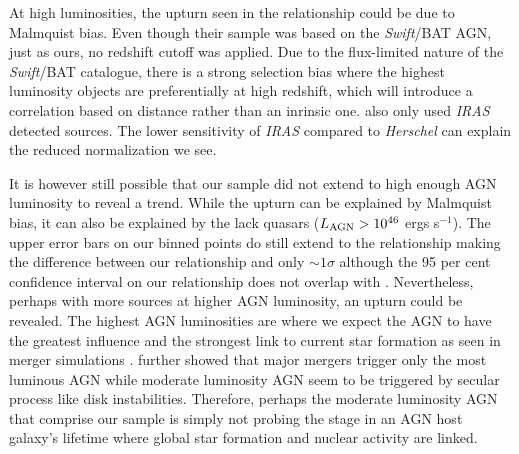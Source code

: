 \documentclass[fleqn, usenatbib]{mnras}
\newcommand{\herschel}{\emph{Herschel}}
\newcommand{\swift}{\textit{Swift}}
\begin{document}
At high luminosities, the upturn seen in the \citet{Rosario:2012fr} relationship could be due to Malmquist bias. Even though their sample was based on the \swift/BAT AGN, just as ours, no redshift cutoff was applied. Due to the flux-limited nature of the \swift/BAT catalogue, there is a strong selection bias where the highest luminosity objects are preferentially at high redshift, which will introduce a correlation based on distance rather than an inrinsic one. \citet{Rosario:2012fr} also only used \textit{IRAS} detected sources. The lower sensitivity of \textit{IRAS} compared to \herschel{} can explain the reduced normalization we see. %

It is however still possible that our sample did not extend to high enough AGN luminosity to reveal a trend. While the upturn can be explained by Malmquist bias, it can also be explained by the lack quasars ($L_{\rm AGN} > 10^{46}$ ergs s$^{-1}$). The upper error bars on our binned points do still extend to the \citet{Rosario:2012fr} relationship making the difference between our relationship and \citet{Rosario:2012fr} only $\sim1\sigma$ although the 95 per cent confidence interval on our relationship does not overlap with \citet{Rosario:2012fr}. Nevertheless, perhaps with more sources at higher AGN luminosity, an upturn could be revealed. The highest AGN luminosities are where we expect the AGN to have the greatest influence and the strongest link to current star formation as seen in merger simulations \citep[e.g.][]{Di-Matteo:2005lr}. \citet{Treister:2012rt} further showed that major mergers trigger only the most luminous AGN while moderate luminosity AGN seem to be triggered by secular process like disk instabilities. Therefore, perhaps the moderate luminosity AGN that comprise our sample is simply not probing the stage in an AGN host galaxy's lifetime where global star formation and nuclear activity are linked. 
\end{document}
